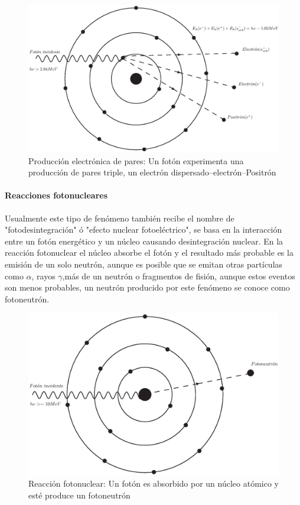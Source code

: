 \begin{figure}[htbp]
    \centering
    \includegraphics[width=.71\linewidth]{./Figures/electpp.eps}
    \caption[Producción electrónica de pares]{Producción electrónica de pares: Un fotón experimenta una producción de pares triple, un electrón dispersado--electrón--Positrón}
    \label{fig:UoC}
\end{figure}

\paragraph{Reacciones fotonucleares}
 Usualmente este tipo de fenómeno también recibe el nombre de "fotodesintegración" ó "efecto nuclear fotoeléctrico", se basa en la interacción entre un fotón energético y un núcleo causando desintegración nuclear. En la reacción fotonuclear el núcleo absorbe el fotón y el resultado más probable es la emisión de un solo neutrón, aunque es posible que se emitan otras partículas como $\alpha$, rayos $\gamma$,más de un neutrón o fragmentos de fisión, aunque estos eventos son menos probables, un neutrón producido por este fenómeno se conoce como fotoneutrón\cite{Podgorsak}.

 \begin{figure}[htbp]
     \centering
     \includegraphics[width=.71\linewidth]{./Figures/fotoneu.eps}
     \caption[Reacción fotonuclear]{Reacción fotonuclear: Un fotón es absorbido por un núcleo atómico y esté produce un fotoneutrón}
     \label{fig:UoC}
 \end{figure}


